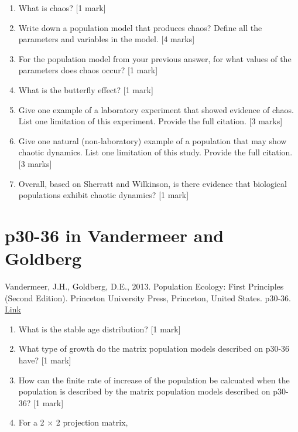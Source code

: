 \documentclass[]{book}
\begin{document}
\begin{enumerate}
\def\labelenumi{\arabic{enumi}.}
\item
  What is chaos? {[}1 mark{]}
\item
  Write down a population model that produces chaos? Define all the
  parameters and variables in the model. {[}4 marks{]}
\item
  For the population model from your previous answer, for what values of
  the parameters does chaos occur? {[}1 mark{]}
\item
  What is the butterfly effect? {[}1 mark{]}
\item
  Give one example of a laboratory experiment that showed evidence of
  chaos. List one limitation of this experiment. Provide the full
  citation. {[}3 marks{]}
\item
  Give one natural (non-laboratory) example of a population that may
  show chaotic dynamics. List one limitation of this study. Provide the
  full citation. {[}3 marks{]}
\item
  Overall, based on Sherratt and Wilkinson, is there evidence that
  biological populations exhibit chaotic dynamics? {[}1 mark{]}
\end{enumerate}

\section{p30-36 in Vandermeer and
Goldberg}\label{p30-36-in-vandermeer-and-goldberg}

Vandermeer, J.H., Goldberg, D.E., 2013. Population Ecology: First
Principles (Second Edition). Princeton University Press, Princeton,
United States. p30-36.
\href{https://ebookcentral-proquest-com.qe2a-proxy.mun.ca/lib/mun/detail.action?docID=1205619}{Link}

\begin{enumerate}
\def\labelenumi{\arabic{enumi}.}
\item
  What is the stable age distribution? {[}1 mark{]}
\item
  What type of growth do the matrix population models described on
  p30-36 have? {[}1 mark{]}
\item
  How can the finite rate of increase of the population be calcuated
  when the population is described by the matrix population models
  described on p30-36? {[}1 mark{]}
\item
  For a 2 \(\times\) 2 projection matrix,
\end{enumerate}
\end{document}
